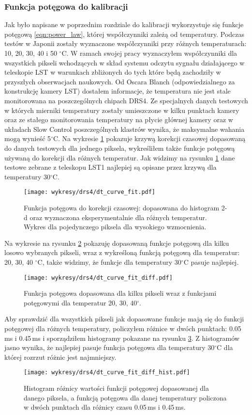 \documentclass[a4paper,11pt,twoside]{article}
\begin{document}
\subsubsection{Funkcja potęgowa do kalibracji}
Jak było napisane w poprzednim rozdziale do kalibracji wykorzystuje się funkcje potęgową \ref{eqn:power_law}, której współczynniki zależą od temperatury. Podczas testów w Japonii zostały wyznaczone współczynniki przy różnych temperaturach: 10, 20, 30, 40 i 50 $^\circ$C. W ramach swojej pracy wyznaczyłem  współczynniki dla wszystkich pikseli wchodzących w skład systemu odczytu sygnału działającego w teleskopie LST w warunkach zbliżonych do tych które będą zachodziły w przyszłych obserwacjach naukowych. Od Oscara Blanch (odpowiedzialnego za konstrukcję kamery LST) dostałem informacje, że temperatura nie jest stale monitorowana na poszczególnych chipach DRS4. Ze specjalnych danych testowych w których mierniki temperatury zostały umieszczone w kilku punktach kamery oraz ze stałego monitorowania temperatury na płycie głównej kamery oraz w układach Slow Control poszczególnych klastrów wynika, że maksymalne wahania mogą wynieść 5$^{\circ}$C. Na wykresie \ref{fig:dt_curve_fit_all_temp} pokazuje krzywą korekcji czasowej dopasowaną do danych testowych dla jednego piksela, wykreśliłem także funkcje potęgową używaną do korekcji dla różnych temperatur. Jak widzimy na rysunku \ref{fig:dt_curve_fit_all_temp} dane testowe zebrane z teleskopu LST1 najlepiej są opisane przez krzywą dla temperatury 30$^{\circ}$C. 
\begin{figure}[H] 
\centering
\texttt{[image: wykresy/drs4/dt\_curve\_fit.pdf]}
\caption{Funkcja potęgowa do korekcji czasowej: dopasowana do histogram 2-d oraz wyznaczona eksperymentalnie dla różnych temperatur. Wykres dla  pojedynczego piksela dla wysokiego wzmocnienia.}
\label{fig:dt_curve_fit_all_temp}
\end{figure}
Na wykresie na rysunku \ref{fig:dt_curve_fit_few_pixels} pokazuję dopasowaną funkcje potęgową dla kilku losowo wybranych pikseli, wraz z wykreśloną funkcją potęgową dla temperatur: 20, 30, 40 $^{\circ}$C, także widzimy, że funkcje dla temperatury 30$^{\circ}$C pasuje najlepiej.
\begin{figure}[H] 
\centering
\texttt{[image: wykresy/drs4/dt\_curve\_fit\_diff.pdf]}
\caption{Funkcja potęgowa dopasowana dla kilku pikseli wraz z funkcjami potęgowymi dla temperatur 20, 30, 40$^{\circ}$.}
\label{fig:dt_curve_fit_few_pixels}
\end{figure}
\newpage
Aby sprawdzić dla wszystkich pikseli jak dopasowane funkcje mają się do funkcji potęgowej dla różnych temperatury, policzyłem różnice w dwóch punktach: 0.05\,ms i 0.45\,ms i sporządziłem histogramy pokazane na rysunku \ref{fig:dt_curve_hist}. Z histogramów jasno wynika, że najlepiej pasuje funkcja potęgowa dla temperatury 30$^{\circ}$C dla której rozrzut różnic jest najmniejszy.
\begin{figure}[H] 
\centering
\texttt{[image: wykresy/drs4/dt\_curve\_fit\_diff\_hist.pdf]}
\caption{Histogram różnicy wartości funkcji potęgowej dopasowanej dla danego piksela, a funkcją potęgowa dla danej temperatury policzona w dwóch punktach dla różnicy czasu 0.05\,ms i 0.45\,ms.}
\label{fig:dt_curve_hist}
\end{figure}
\end{document}
